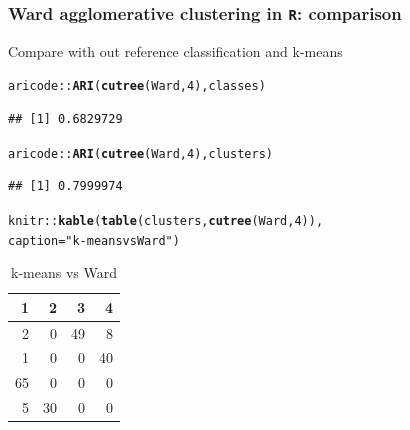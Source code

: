 \documentclass{beamer}\usepackage[]{graphicx}\usepackage[]{color}
\makeatletter
\newcommand{\hlnum}[1]{\textcolor[rgb]{0.686,0.059,0.569}{#1}}%
\newcommand{\hlstr}[1]{\textcolor[rgb]{0.192,0.494,0.8}{#1}}%
\newcommand{\hlopt}[1]{\textcolor[rgb]{0,0,0}{#1}}%
\newcommand{\hlstd}[1]{\textcolor[rgb]{0.345,0.345,0.345}{#1}}%
\newcommand{\hlkwc}[1]{\textcolor[rgb]{0.333,0.667,0.333}{#1}}%
\newcommand{\hlkwd}[1]{\textcolor[rgb]{0.737,0.353,0.396}{\textbf{#1}}}%
\newenvironment{kframe}{%
 \def\at@end@of@kframe{}%
 \ifinner\ifhmode%
  \def\at@end@of@kframe{\end{minipage}}%
  \begin{minipage}{\columnwidth}%
 \fi\fi%
 \def\FrameCommand##1{\hskip\@totalleftmargin \hskip-\fboxsep
 \colorbox{shadecolor}{##1}\hskip-\fboxsep
     \hskip-\linewidth \hskip-\@totalleftmargin \hskip\columnwidth}%
 \MakeFramed {\advance\hsize-\width
   \@totalleftmargin\z@ \linewidth\hsize
   \@setminipage}}%
 {\par\unskip\endMakeFramed%
 \at@end@of@kframe}
\newenvironment{knitrout}{}{} %
\makeatother
\begin{document}
\begin{frame}
  \frametitle{Ward agglomerative clustering in \texttt{R}: comparison}

Compare with out reference classification and k-means
\begin{knitrout}\scriptsize
{}\color{fgcolor}\begin{kframe}
\begin{alltt}
\hlstd{aricode}\hlopt{::}\hlkwd{ARI}\hlstd{(}\hlkwd{cutree}\hlstd{(Ward,} \hlnum{4}\hlstd{), classes)}
\end{alltt}
\begin{verbatim}
## [1] 0.6829729
\end{verbatim}
\begin{alltt}
\hlstd{aricode}\hlopt{::}\hlkwd{ARI}\hlstd{(}\hlkwd{cutree}\hlstd{(Ward,} \hlnum{4}\hlstd{), clusters)}
\end{alltt}
\begin{verbatim}
## [1] 0.7999974
\end{verbatim}
\end{kframe}
\end{knitrout}

\begin{knitrout}\scriptsize
{}\color{fgcolor}\begin{kframe}
\begin{alltt}
\hlstd{knitr}\hlopt{::}\hlkwd{kable}\hlstd{(}\hlkwd{table}\hlstd{(clusters,} \hlkwd{cutree}\hlstd{(Ward,}\hlnum{4}\hlstd{)),}
\hlkwc{caption} \hlstd{=} \hlstr{"k-means vs Ward"}\hlstd{)}
\end{alltt}
\end{kframe}\begin{table}[t]

\caption{\label{tab:contingency_table_kmeans_vs_ward}k-means vs Ward}
\centering
\begin{tabular}{r|r|r|r}
\hline
1 & 2 & 3 & 4\\
\hline
2 & 0 & 49 & 8\\
\hline
1 & 0 & 0 & 40\\
\hline
65 & 0 & 0 & 0\\
\hline
5 & 30 & 0 & 0\\
\hline
\end{tabular}
\end{table}


\end{knitrout}



\end{frame}
\end{document}
